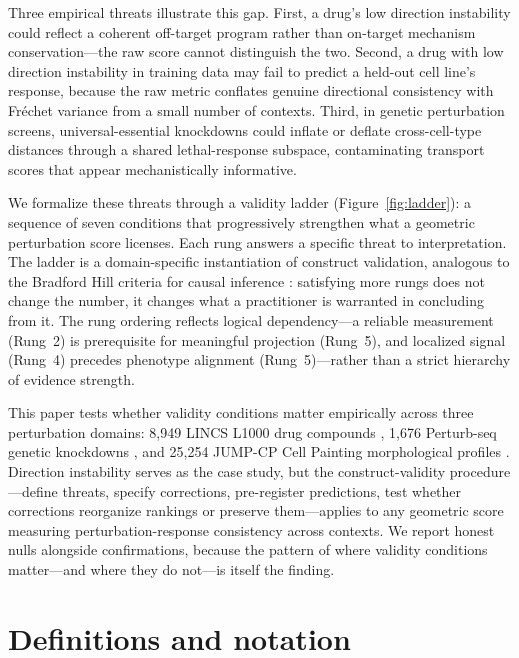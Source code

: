 \documentclass[11pt]{article}
\begin{document}
Three empirical threats illustrate this gap. First, a drug's low direction
instability could reflect a coherent off-target program rather than
on-target mechanism conservation---the raw score cannot distinguish the
two. Second, a drug with low direction instability in training data may
fail to predict a held-out cell line's response, because the raw metric
conflates genuine directional consistency with Fr\'echet variance from a
small number of contexts. Third, in genetic perturbation screens,
universal-essential knockdowns could inflate or deflate cross-cell-type
distances through a shared lethal-response subspace, contaminating
transport scores that appear mechanistically informative.

We formalize these threats through a validity ladder
(Figure~\ref{fig:ladder}): a sequence of seven conditions that
progressively strengthen what a geometric perturbation score licenses.
Each rung answers a specific threat to interpretation. The ladder is a
domain-specific instantiation of construct validation, analogous to the
Bradford Hill criteria for causal inference
\citep{hill1965environment,freiesleben2025benchmarking}: satisfying more
rungs does not change the number, it changes what a practitioner is
warranted in concluding from it. The rung ordering reflects logical dependency---a reliable
measurement (Rung~2) is prerequisite for meaningful projection (Rung~5),
and localized signal (Rung~4) precedes phenotype alignment (Rung~5)---rather
than a strict hierarchy of evidence strength.

This paper tests whether validity conditions matter empirically across three
perturbation domains: 8{,}949 LINCS L1000 drug compounds
\citep{subramanian2017next}, 1{,}676 Perturb-seq genetic knockdowns
\citep{replogle2022mapping}, and 25{,}254 JUMP-CP Cell Painting morphological
profiles \citep{chandrasekaran2023jump}. Direction instability serves as
the case study, but the construct-validity procedure---define threats,
specify corrections, pre-register predictions, test whether corrections
reorganize rankings or preserve them---applies to any geometric score
measuring perturbation-response consistency across contexts. We report
honest nulls alongside confirmations, because the pattern of where
validity conditions matter---and where they do not---is itself the finding.

\section{Definitions and notation}
\end{document}
